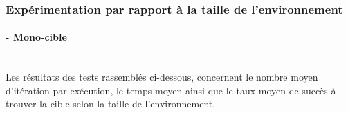 
\subsubsection{Expérimentation par rapport à la taille de l'environnement}
\paragraph{- Mono-cible}
\textbf{ }\\
Les résultats des tests rassemblés ci-dessous, concernent le nombre moyen d'itération par exécution, le temps moyen ainsi que le taux moyen de succès à trouver la cible selon la taille de l'environnement.

%		


